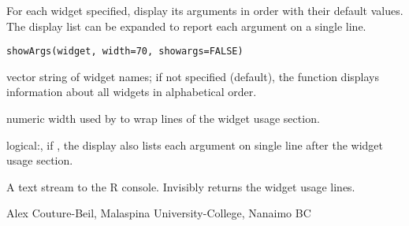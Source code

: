 \documentclass[letterpaper]{book}
\begin{document}
\begin{Description}\relax
For each widget specified, display its arguments in order with their default values. 
The display list can be expanded to report each argument on a single line.
\end{Description}
\begin{Usage}
\begin{verbatim}
showArgs(widget, width=70, showargs=FALSE)
\end{verbatim}
\end{Usage}
\begin{Arguments}
\begin{ldescription}
\item[\code{widget}] vector string of widget names; if not specified (default), 
the function displays information about all widgets in alphabetical order.
\item[\code{width}] numeric width used by  to wrap lines of the widget
usage section.
\item[\code{showargs}] logical:, if , the display also lists each argument
on single line after the widget usage section.
\end{ldescription}
\end{Arguments}
\begin{Value}
A text stream to the R console. Invisibly returns the widget usage lines.
\end{Value}
\begin{Author}\relax
Alex Couture-Beil, Malaspina University-College, Nanaimo BC
\end{Author}
\end{document}
